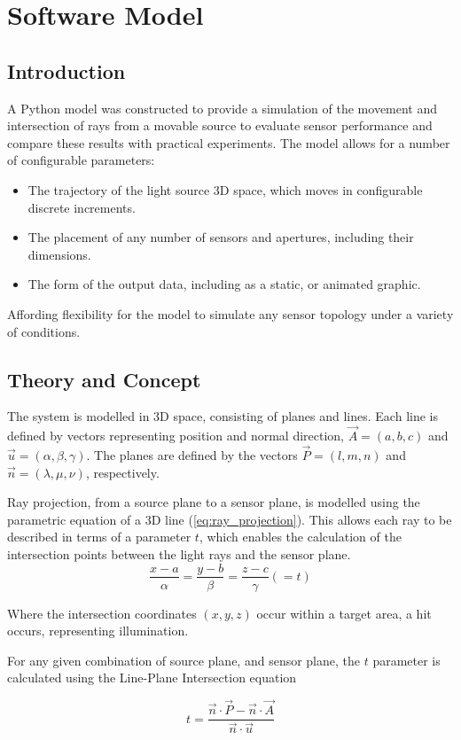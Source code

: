 \section{Software Model}
\subsection{Introduction}
A Python model was constructed to provide a simulation of the movement and intersection of rays from a movable source to evaluate sensor performance and compare these results with practical experiments.
The model allows for a number of configurable parameters:
\begin{itemize}
    \item The trajectory of the light source 3D space, which moves in configurable discrete increments.
    \item The placement of any number of sensors and apertures, including their dimensions.
    \item The form of the output data, including as a static, or animated graphic.
\end{itemize}
Affording flexibility for the model to simulate any sensor topology under a variety of conditions.

\subsection{Theory and Concept}
The system is modelled in 3D space, consisting of planes and lines. 
Each line is defined by vectors representing position and normal direction, $ \vec{A} = (a,b,c)$ and $ \vec{u} = (\alpha, \beta, \gamma)$.
The planes are defined by the vectors $\vec{P} = (l,m,n) $ and $ \vec{n} = (\lambda, \mu, \nu)$, respectively.

Ray projection, from a source plane to a sensor plane, is modelled using the parametric equation of a 3D line (\ref{eq:ray_projection}). This allows each ray to be described in terms of a parameter $t$, which enables the calculation of the intersection points between the light rays and the sensor plane. 
\begin{equation}
\frac{x - a}{\alpha} = \frac{y - b}{\beta} = \frac{z - c}{\gamma} (=t)
\label{eq:ray_projection}
\end{equation}

Where the intersection coordinates $(x,y,z)$ occur within a target area, a hit occurs, representing illumination.

For any given combination of source plane, and sensor plane, the $t$ parameter is calculated using the Line-Plane Intersection equation

\begin{equation}
    t = \frac{\vec{n} \cdot \vec{P} - \vec{n} \cdot \vec{A}}{\vec{n} \cdot \vec{u}}
    \label{eq:Line_Plane_Intersection}
\end{equation}

